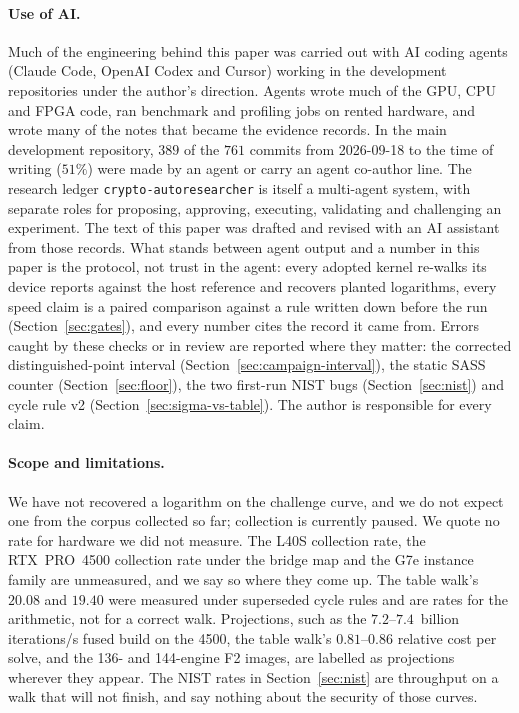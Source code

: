 \paragraph{Use of AI.} Much of the engineering behind this paper was
carried out with AI coding agents (Claude Code, OpenAI Codex and Cursor)
working in the development repositories under the author's direction.
Agents wrote much of the GPU, CPU and FPGA code, ran benchmark and
profiling jobs on rented hardware, and wrote many of the notes that
became the evidence records. In the main development repository, $389$ of the
$761$ commits from 2026-09-18 to the time of writing ($51\%$) were made
by an agent or carry an agent co-author line. The research ledger
\texttt{crypto-autoresearcher} is itself a multi-agent system, with
separate roles for proposing, approving, executing, validating and
challenging an experiment. The text of this paper was drafted and
revised with an AI assistant from those records. What stands between
agent output and a number in this paper is the protocol, not trust in
the agent: every adopted kernel re-walks its device reports against the
host reference and recovers planted logarithms, every speed claim is a
paired comparison against a rule written down before the run
(Section~\ref{sec:gates}), and every number cites the record it came
from. Errors caught by these checks or in review are reported where they
matter: the corrected distinguished-point interval
(Section~\ref{sec:campaign-interval}), the static SASS counter
(Section~\ref{sec:floor}), the two first-run NIST bugs
(Section~\ref{sec:nist}) and cycle rule v2
(Section~\ref{sec:sigma-vs-table}). The author is responsible for every
claim.

\paragraph{Scope and limitations.} We have not recovered a logarithm on
the challenge curve, and we do not expect one from the corpus
collected so far; collection is currently paused. We quote no rate for
hardware we did not measure. The L40S collection rate, the RTX~PRO~4500
collection rate under the bridge map and the G7e instance family are
unmeasured, and we say so where they come up. The table walk's
$20.08$ and $19.40$ were measured under superseded cycle rules and are
rates for the arithmetic, not for a correct walk. Projections, such as
the $7.2$--$7.4$~billion iterations/s fused build on the 4500, the table walk's
$0.81$--$0.86$ relative cost per solve, and the 136- and 144-engine F2
images, are labelled as projections wherever they appear. The NIST
rates in Section~\ref{sec:nist} are throughput on a walk that will not
finish, and say nothing about the security of those curves.
